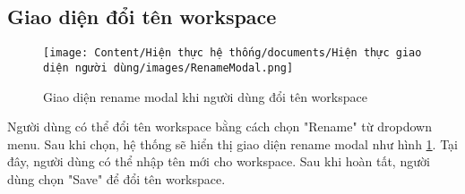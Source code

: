 \subsection{Giao diện đổi tên workspace}

\begin{figure}[H]
    \centering
    \texttt{[image: Content/Hiện thực hệ thống/documents/Hiện thực giao diện người dùng/images/RenameModal.png]}
    \vspace{0.5cm}
    \caption{Giao diện rename modal khi người dùng đổi tên workspace}
    \label{fig: Giao diện rename modal khi người dùng đổi tên workspace}
\end{figure}

Người dùng có thể đổi tên workspace bằng cách chọn "Rename" từ dropdown menu. Sau khi chọn, hệ thống sẽ hiển thị giao diện rename modal như hình \ref{fig: Giao diện rename modal khi người dùng đổi tên workspace}. Tại đây, người dùng có thể nhập tên mới cho workspace. Sau khi hoàn tất, người dùng chọn "Save" để đổi tên workspace.